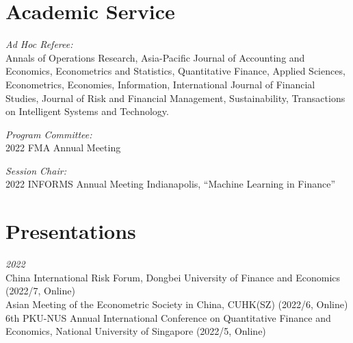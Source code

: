 \documentclass[margin]{res}
\begin{document}
\begin{resume}

\section{\sc Academic Service}

\textit{Ad Hoc Referee:}  \\
Annals of Operations Research,
Asia-Pacific Journal of Accounting and Economics,
Econometrics and Statistics, 
Quantitative Finance,
Applied Sciences,
Econometrics,
Economies, 
Information,
International Journal of Financial Studies,
Journal of Risk and Financial Management,
Sustainability,
Transactions on Intelligent Systems and Technology.

\textit{Program Committee:} \\
2022 FMA Annual Meeting

\textit{Session Chair:}  \\
2022 INFORMS Annual Meeting Indianapolis, “Machine Learning in Finance”

\vspace{5mm}

\section{\sc Presentations}

\textit{2022} \\
China International Risk Forum, Dongbei University of Finance and Economics  (2022/7, Online) \\
Asian Meeting of the Econometric Society in China, CUHK(SZ) (2022/6, Online) \\
6th PKU-NUS Annual International Conference on Quantitative Finance and Economics, National University of Singapore (2022/5, Online) \\


\end{resume}
\end{document}
